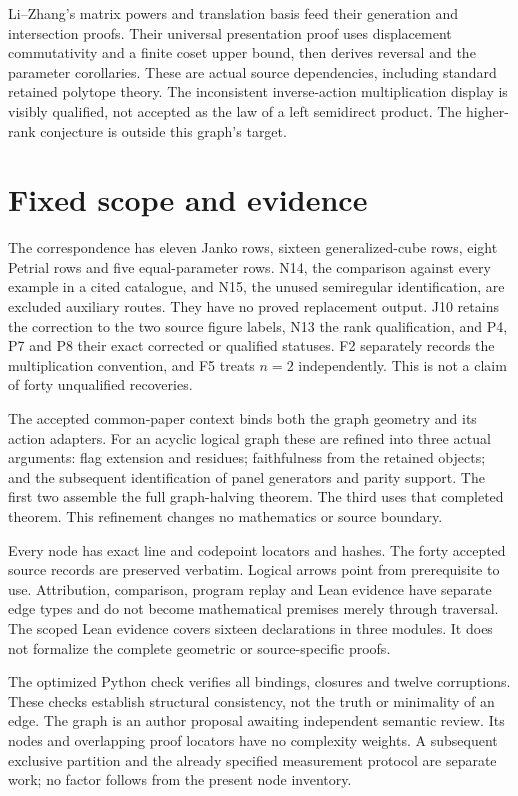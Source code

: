 \documentclass[a4paper,11pt]{article}
\begin{document}
Li--Zhang's matrix powers and translation basis feed their generation and
intersection proofs. Their universal presentation proof uses displacement
commutativity and a finite coset upper bound, then derives reversal and the
parameter corollaries. These are actual source dependencies, including standard
retained polytope theory. The inconsistent inverse-action multiplication display
is visibly qualified, not accepted as the law of a left semidirect product.
The higher-rank conjecture is outside this graph's target.

\section{Fixed scope and evidence}
The correspondence has eleven Janko rows, sixteen generalized-cube rows, eight
Petrial rows and five equal-parameter rows. N14, the comparison against every
example in a cited catalogue, and N15, the unused semiregular identification,
are excluded auxiliary routes. They have no proved replacement output. J10
retains the correction to the two source figure labels, N13 the rank qualification,
and P4, P7 and P8 their exact corrected or qualified statuses. F2 separately
records the multiplication convention, and F5 treats $n=2$ independently.
This is not a claim of forty unqualified recoveries.

The accepted common-paper context binds both the graph geometry and its action
adapters. For an acyclic logical graph these are refined into three actual
arguments: flag extension and residues; faithfulness from the retained objects;
and the subsequent identification of panel generators and parity support.
The first two assemble the full graph-halving theorem. The third uses that
completed theorem. This refinement changes no mathematics or source boundary.

Every node has exact line and codepoint locators and hashes. The forty accepted
source records are preserved verbatim. Logical arrows point from prerequisite
to use. Attribution, comparison, program replay and Lean evidence have separate
edge types and do not become mathematical premises merely through traversal.
The scoped Lean evidence covers sixteen declarations in three modules. It does
not formalize the complete geometric or source-specific proofs.

The optimized Python check verifies all bindings, closures and twelve corruptions.
These checks establish structural consistency, not the truth or minimality of an
edge. The graph is an author proposal awaiting independent semantic review.
Its nodes and overlapping proof locators have no complexity weights. A subsequent
exclusive partition and the already specified measurement protocol are separate
work; no factor follows from the present node inventory.
\end{document}
